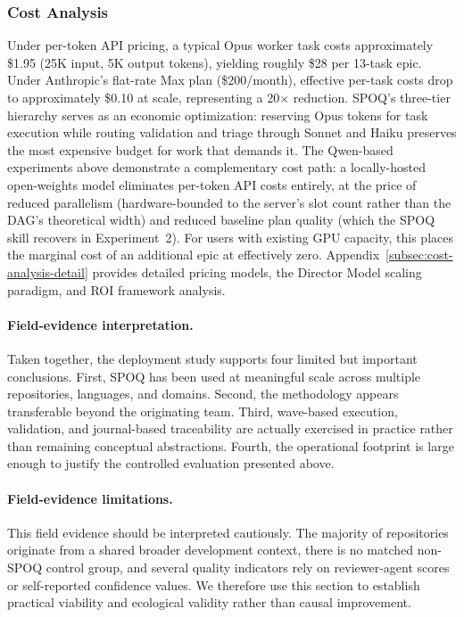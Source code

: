\subsubsection{Cost Analysis}
\label{subsec:cost-analysis}

Under per-token API pricing, a typical Opus worker task costs approximately
\$1.95 (25K input, 5K output tokens), yielding roughly \$28 per 13-task epic.
Under Anthropic's flat-rate Max plan (\$200/month), effective per-task costs
drop to approximately \$0.10 at scale, representing a 20$\times$ reduction.
SPOQ's three-tier hierarchy serves as an economic optimization: reserving Opus
tokens for task execution while routing validation and triage through Sonnet
and Haiku preserves the most expensive budget for work that demands it.
The Qwen-based experiments above demonstrate a complementary cost path: a
locally-hosted open-weights model eliminates per-token API costs entirely,
at the price of reduced parallelism (hardware-bounded to the server's slot
count rather than the DAG's theoretical width) and reduced baseline plan
quality (which the SPOQ skill recovers in Experiment~2). For users with
existing GPU capacity, this places the marginal cost of an additional epic
at effectively zero. Appendix~\ref{subsec:cost-analysis-detail} provides
detailed pricing models, the Director Model scaling paradigm, and ROI
framework analysis.

\paragraph{Field-evidence interpretation.}
Taken together, the deployment study supports four limited but important conclusions. First, SPOQ has been used at meaningful scale across multiple repositories, languages, and domains. Second, the methodology appears transferable beyond the originating team. Third, wave-based execution, validation, and journal-based traceability are actually exercised in practice rather than remaining conceptual abstractions. Fourth, the operational footprint is large enough to justify the controlled evaluation presented above.

\paragraph{Field-evidence limitations.}
This field evidence should be interpreted cautiously. The majority of repositories originate from a shared broader development context, there is no matched non-SPOQ control group, and several quality indicators rely on reviewer-agent scores or self-reported confidence values. We therefore use this section to establish practical viability and ecological validity rather than causal improvement.

